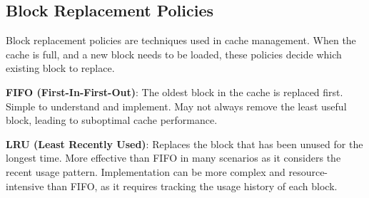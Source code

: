 \vspace{-0.3cm}
\subsection*{Block Replacement Policies}
\vspace{-0.1cm}

\noindent
Block replacement policies are techniques used in cache management. When the cache is full, and a new block needs to be loaded, these policies decide which existing block to replace.

\noindent
\textbf{FIFO (First-In-First-Out)}: The oldest block in the cache is replaced first.
Simple to understand and implement.
May not always remove the least useful block, leading to suboptimal cache performance.

\noindent
\textbf{LRU (Least Recently Used)}: Replaces the block that has been unused for the longest time.
More effective than FIFO in many scenarios as it considers the recent usage pattern.
Implementation can be more complex and resource-intensive than FIFO, as it requires tracking the usage history of each block.

